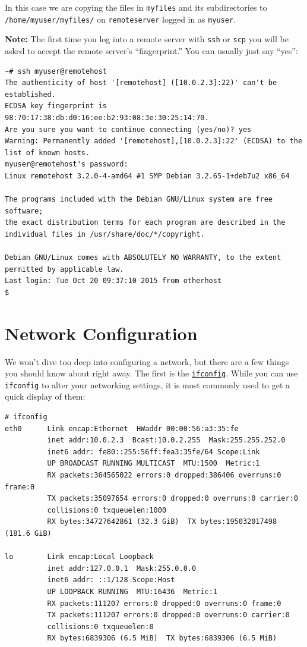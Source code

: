\documentclass[10pt,]{book}
\numberwithin{figure}{chapter}
\begin{document}
In this case we are copying the files in \texttt{myfiles} and its
subdirectories to \texttt{/home/myuser/myfiles/} on
\texttt{remoteserver} logged in as \texttt{myuser}.

\textbf{Note:} The first time you log into a remote server with
\texttt{ssh} or \texttt{scp} you will be asked to accept the remote
server's ``fingerprint.'' You can usually just say ``yes'':

\begin{verbatim}
~# ssh myuser@remotehost
The authenticity of host '[remotehost] ([10.0.2.3]:22)' can't be established.
ECDSA key fingerprint is 98:70:17:38:db:d0:16:ee:b2:93:08:3e:30:25:14:70.
Are you sure you want to continue connecting (yes/no)? yes
Warning: Permanently added '[remotehost],[10.0.2.3]:22' (ECDSA) to the list of known hosts.
myuser@remotehost's password:
Linux remotehost 3.2.0-4-amd64 #1 SMP Debian 3.2.65-1+deb7u2 x86_64

The programs included with the Debian GNU/Linux system are free software;
the exact distribution terms for each program are described in the
individual files in /usr/share/doc/*/copyright.

Debian GNU/Linux comes with ABSOLUTELY NO WARRANTY, to the extent
permitted by applicable law.
Last login: Tue Oct 20 09:37:10 2015 from otherhost
$
\end{verbatim}

\section{Network Configuration}\label{network-configuration}

We won't dive too deep into configuring a network, but there are a few
things you should know about right away. The first is the
\href{http://linux.die.net/man/8/ifconfig}{\texttt{ifconfig}}. While you
can use \texttt{ifconfig} to alter your networking settings, it is most
commonly used to get a quick display of them:

\begin{verbatim}
# ifconfig
eth0      Link encap:Ethernet  HWaddr 00:00:56:a3:35:fe
          inet addr:10.0.2.3  Bcast:10.0.2.255  Mask:255.255.252.0
          inet6 addr: fe80::255:56ff:fea3:35fe/64 Scope:Link
          UP BROADCAST RUNNING MULTICAST  MTU:1500  Metric:1
          RX packets:364565022 errors:0 dropped:386406 overruns:0 frame:0
          TX packets:35097654 errors:0 dropped:0 overruns:0 carrier:0
          collisions:0 txqueuelen:1000
          RX bytes:34727642861 (32.3 GiB)  TX bytes:195032017498 (181.6 GiB)

lo        Link encap:Local Loopback
          inet addr:127.0.0.1  Mask:255.0.0.0
          inet6 addr: ::1/128 Scope:Host
          UP LOOPBACK RUNNING  MTU:16436  Metric:1
          RX packets:111207 errors:0 dropped:0 overruns:0 frame:0
          TX packets:111207 errors:0 dropped:0 overruns:0 carrier:0
          collisions:0 txqueuelen:0
          RX bytes:6839306 (6.5 MiB)  TX bytes:6839306 (6.5 MiB)
\end{verbatim}
\end{document}
